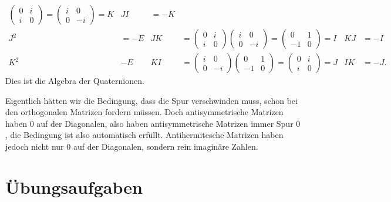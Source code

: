 \begin{beispiel}
\begin{align*}
\begin{pmatrix} 0&i \\  i& 0 \end{pmatrix}
=
\begin{pmatrix} i&0 \\  0&-i \end{pmatrix}
=
K
&
JI
&=
-K
\\
J^2
&=
-E
&
JK
&=
\begin{pmatrix} 0&i \\  i& 0 \end{pmatrix}
\begin{pmatrix} i&0 \\  0&-i \end{pmatrix}
=
\begin{pmatrix} 0&1 \\ -1& 0 \end{pmatrix}
=
I
&
KJ
&=
-I
\\
K^2
&
-E
&
KI
&=
\begin{pmatrix} i&0 \\  0&-i \end{pmatrix}
\begin{pmatrix} 0&1 \\ -1& 0 \end{pmatrix}
=
\begin{pmatrix} 0&i \\  i& 0 \end{pmatrix}
=
J
&
IK
&=
-J.
\end{align*}
%
Dies ist die Algebra der Quaternionen.
\end{beispiel}

Eigentlich hätten wir die Bedingung, dass die Spur verschwinden muss,
schon bei den orthogonalen Matrizen fordern müssen.
Doch antisymmetrische Matrizen haben $0$ auf der Diagonalen, also haben
antisymmetrische Matrizen immer Spur $0$, die Bedingung ist also
automatisch erfüllt.
Antihermitesche Matrizen haben jedoch nicht nur $0$ auf der Diagonalen,
sondern rein imaginäre Zahlen.

\section*{Übungsaufgaben}
